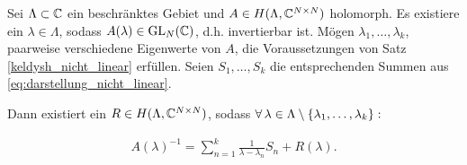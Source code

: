 \begin{corollary} \label{keldysh_multi}

    Sei $\Lambda \subset \mathbb{C}$ ein beschränktes Gebiet und $A \in H(\Lambda, \mathbb{C}^{N \times N})$ holomorph.
    Es existiere ein $\lambda \in \Lambda$, sodass $A(\lambda) \in \operatorname{GL}_N(\mathbb{C})$, d.h. invertierbar ist.
    Mögen $\lambda_1, \dots, \lambda_k$, paarweise verschiedene Eigenwerte von $A$, die Voraussetzungen von Satz \ref{keldysh_nicht_linear} erfüllen.
    Seien $S_1, \dots, S_k$ die entsprechenden Summen aus \eqref{eq:darstellung_nicht_linear}.

    Dann existiert ein $R \in H(\Lambda, \mathbb{C}^{N \times N})$, sodass $\forall \, \lambda \in \Lambda \setminus {\left \{ \lambda_1, \dots, \lambda_k \right \}}:$

    \begin{align*}
        A(\lambda)^{-1}
        =
        \sum_{n=1}^k
            \frac{1}{\lambda - \lambda_n} S_n
        +
        R(\lambda).
    \end{align*}

\end{corollary}
